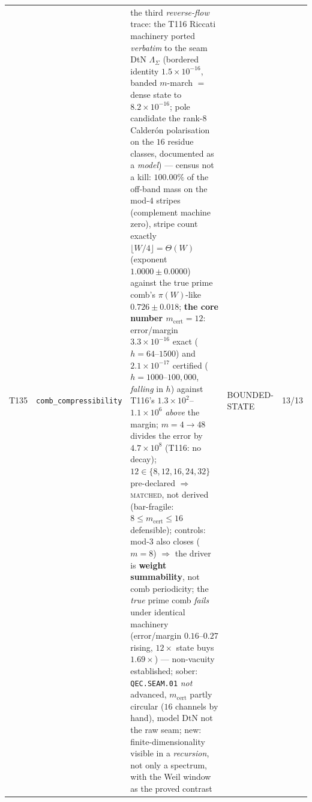\documentclass[11pt,a4paper]{article}
\begin{document}
{\begin{xltabular}{\linewidth}{@{}p{0.95cm} >{\raggedright\arraybackslash}p{3.1cm} Y >{\raggedright\scriptsize\arraybackslash}p{3.35cm} p{1.15cm}@{}}
T135 & \texttt{\scriptsize comb\_\allowbreak compressibility} & the third \emph{reverse-flow} trace: the T116 Riccati machinery ported \emph{verbatim} to the seam DtN $\Lambda_\Sigma$ (bordered identity $1.5\times10^{-16}$, banded $m$-march $=$ dense state to $8.2\times10^{-16}$; pole candidate the rank-$8$ Calder\'on polarisation on the $16$ residue classes, documented as a \emph{model}) --- census not a kill: $100.00\%$ of the off-band mass on the mod-$4$ stripes (complement machine zero), stripe count exactly $\lfloor W/4\rfloor=\Theta(W)$ (exponent $1.0000\pm0.0000$) against the true prime comb's $\pi(W)$-like $0.726\pm0.018$; \textbf{the core number $m_{\mathrm{cert}}=12$}: error/margin $3.3\times10^{-16}$ exact ($h=64$--$1500$) and $2.1\times10^{-17}$ certified ($h=1000$--$100{,}000$, \emph{falling} in $h$) against T116's $1.3\times10^{2}$--$1.1\times10^{6}$ \emph{above} the margin; $m=4\to48$ divides the error by $4.7\times10^{8}$ (T116: no decay); $12\in\{8,12,16,24,32\}$ pre-declared $\Rightarrow$ \textsc{matched}, not derived (bar-fragile: $8\le m_{\mathrm{cert}}\le16$ defensible); controls: mod-$3$ also closes ($m=8$) $\Rightarrow$ the driver is \textbf{weight summability}, not comb periodicity; the \emph{true} prime comb \emph{fails} under identical machinery (error/margin $0.16$--$0.27$ rising, $12\times$ state buys $1.69\times$) --- non-vacuity established; sober: \texttt{QEC.SEAM.01} \emph{not} advanced, $m_{\mathrm{cert}}$ partly circular ($16$ channels by hand), model DtN not the raw seam; new: finite-dimensionality visible in a \emph{recursion}, not only a spectrum, with the Weil window as the proved contrast & BOUNDED-STATE & 13/13\\

\end{xltabular}}
\end{document}
